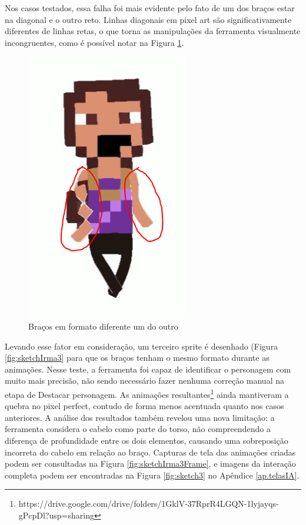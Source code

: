 
Nos casos testados, essa falha foi mais evidente pelo fato de um dos braços estar na diagonal e o outro reto. Linhas diagonais em pixel art são significativamente diferentes de linhas retas, o que torna as manipulações da ferramenta visualmente incongruentes, como é possível notar na Figura \ref{fig:sketchBraco}.

\begin{figure}[htbp]
    \centering
    \caption{\small Braços em formato diferente um do outro}
    \label{fig:sketchBraco}
    \includegraphics[width=0.3\linewidth]{figs/sketchLab/bracos.PNG}
\end{figure}


Levando esse fator em consideração, um terceiro sprite é desenhado (Figura \ref{fig:sketchIrma3} para que os braços tenham o mesmo formato durante as animações. Nesse teste, a ferramenta foi capaz de identificar o personagem com muito mais precisão, não sendo necessário fazer nenhuma correção manual na etapa de Destacar personagem. As animações resultantes\footnote{https://drive.google.com/drive/folders/1GklV-37RprR4LGQN-1lyjayqs-gPcpDl?usp=sharing} ainda mantiveram a quebra no pixel perfect, contudo de forma menos acentuada quanto nos casos anteriores. A análise dos resultados também revelou uma nova limitação: a ferramenta considera o cabelo como parte do torso, não compreendendo a diferença de profundidade entre os dois elementos, causando uma sobreposição incorreta do cabelo em relação ao braço. Capturas de tela das animações criadas podem ser consultadas na Figura \ref{fig:sketchIrma3Frame}, e imagens da interação completa podem ser encontradas na Figura \ref{fig:sketch3} no Apêndice \ref{ap.telasIA}.

